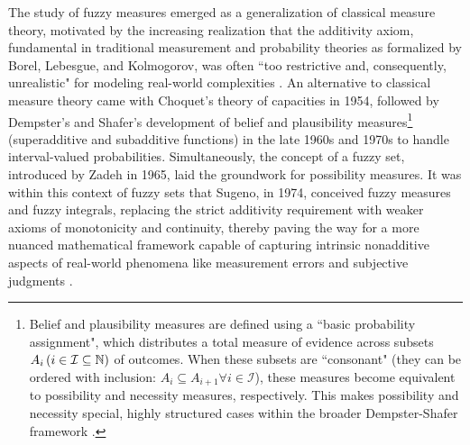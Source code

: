 









The study of fuzzy measures emerged as a generalization of classical measure theory, motivated by the increasing realization that the additivity axiom, fundamental in traditional measurement and probability theories as formalized by Borel, Lebesgue, and Kolmogorov, was often ``too restrictive and, consequently, unrealistic" for modeling real-world complexities \cite[p.~10]{FuzzyMeasureHistory}. An alternative to classical measure theory came with Choquet's theory of capacities in 1954, followed by Dempster's and Shafer's development of belief and plausibility measures\footnote{Belief and plausibility measures are defined using a ``basic probability assignment", which distributes a total measure of evidence across subsets $A_i \,(i\in \mathcal{I}\subseteq \mathbb{N})$ of outcomes. When these subsets are ``consonant" (they can be ordered with inclusion: $A_i \subseteq  A_{i+1}\forall i\in \mathcal{I}$), these measures become equivalent to possibility and necessity measures, respectively. This makes possibility and necessity special, highly structured cases within the broader Dempster-Shafer framework \cite[Thm.~3.23, Thm.~3.25]{FuzzyMeasureHistory}.} (superadditive and subadditive functions) in the late 1960s and 1970s to handle interval-valued probabilities. Simultaneously, the concept of a fuzzy set, introduced by Zadeh in 1965, laid the groundwork for possibility measures. It was within this context of fuzzy sets that Sugeno, in 1974, conceived fuzzy measures and fuzzy integrals, replacing the strict additivity requirement with weaker axioms of monotonicity and continuity, thereby paving the way for a more nuanced mathematical framework capable of capturing intrinsic nonadditive aspects of real-world phenomena like measurement errors and subjective judgments \cite[p.~13]{FuzzyMeasureHistory}.\\

